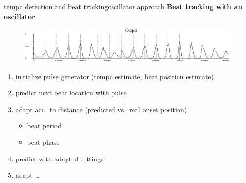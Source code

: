         \begin{frame}{tempo detection and beat tracking}{oscillator approach}
            \textbf{Beat tracking with an oscillator}
            \begin{figure}
                \centering
                    \includegraphics[scale=.3]{graph/BPM_large_oscillator}
            \end{figure}
            
            \begin{enumerate}
                \item	initialize pulse generator (tempo estimate, beat position estimate)
                \item<2->	predict next beat location with pulse
                \item<3->	adapt acc.\ to distance (predicted vs.\ real onset position)
                    \begin{itemize}
                        \item	beat period
                        \item	beat phase
                    \end{itemize}
                \item<4->	predict with adapted settings
                \item<4->   adapt \ldots
            \end{enumerate}
        \end{frame}
